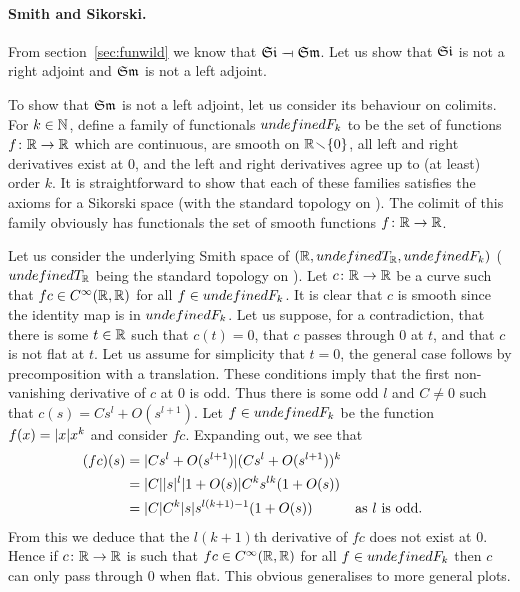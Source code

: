\documentclass[%
a4paper,%
arxiv,%
defaults
]{myclass}
\begin{document}
\paragraph{Smith and Sikorski.}

From section~\ref{sec:funwild} we know that \(\SmSi \adjoint \SiSm\).
Let us show that \(\SmSi\) is not a right adjoint and \(\SiSm\) is not a left adjoint.

To show that \(\SiSm\) is not a left adjoint, let us consider its behaviour on colimits.
For \(k \in \mathbb{N}\), define a family of functionals \(\m{F}_k\) to be the set of functions \(f \colon \mathbb{R} \to \mathbb{R}\) which are continuous, are smooth on \(\mathbb{R} \!\smallsetminus\! \{0\}\), all left and right derivatives exist at \(0\), and the left and right derivatives agree up to (at least) order \(k\).
It is straightforward to show that each of these families satisfies the axioms for a Sikorski space (with the standard topology on \R).
The colimit of this family obviously has functionals the set of smooth functions \(f \colon \mathbb{R} \to \mathbb{R}\).

Let us consider the underlying Smith space of
 \((\R, \m{T}_{\R}, \m{F}_k)\)
(\(\m{T}_{\R}\) being the standard topology on \R).
Let \(c \colon \mathbb{R} \to \mathbb{R}\) be a curve such that \(f c \in C^\infty(\mathbb{R},\mathbb{R})\) for all \(f \in \m{F}_k\).
It is clear that \(c\) is smooth since the identity map is in \(\m{F}_k\).
Let us suppose, for a contradiction, that there is some \(t \in \mathbb{R}\) such that \(c(t) = 0\), that \(c\) passes through \(0\) at \(t\), and that \(c\) is not flat at \(t\).
Let us assume for simplicity that \(t = 0\), the general case follows by precomposition with a translation.
These conditions imply that the first non\hyp{}vanishing derivative of \(c\) at \(0\) is odd.
Thus there is some odd \(l\) and \(C \ne 0\) such that
 \(c(s) = C s^l + O(s^{l+1})\).
Let \(f \in \m{F}_k\) be the function \(f(x) = \lvert x \rvert x^k\) and consider \(f c\).
Expanding out, we see that
%
\begin{align*}
 (f c)(s) &%
 = \sabs{C s^l + O(s^{l+1})}(C s^l + O(s^{l+1}))^k \\
 &%
 = \sabs{C} \sabs{s}^l \sabs{1 + O(s)} C^k s^{l k}(1 + O(s)) \\
 &%
 = \sabs{C} C^k \sabs{s} s^{l (k+1) - 1}(1 + O(s)) &%
 &
 \text{as \(l\) is odd}.
\end{align*}
%
From this we deduce that the \(l(k+1)\)th derivative of \(f c\) does not exist at \(0\).
Hence if \(c \colon \mathbb{R} \to \mathbb{R}\) is such that \(f c \in C^\infty(\mathbb{R},\mathbb{R})\) for all \(f \in \m{F}_k\) then \(c\) can only pass through \(0\) when flat.
This obvious generalises to more general plots.
\end{document}
